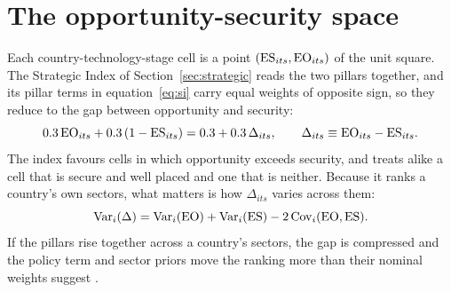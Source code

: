 \section{The opportunity-security space}\label{sec:joint}\label{sec:joint_space}

Each country-technology-stage cell is a point $(\mathrm{ES}_{its},\mathrm{EO}_{its})$ of the unit square. The
Strategic Index of Section~\ref{sec:strategic} reads the two pillars together, and its pillar terms
in equation~\eqref{eq:si} carry equal weights of opposite sign, so they reduce to the gap between
opportunity and security:
\begin{equation}\label{eq:joint_gap}
  0.3\,\mathrm{EO}_{its}+0.3\,(1-\mathrm{ES}_{its})=0.3+0.3\,\Delta_{its},\qquad
  \Delta_{its}\equiv\mathrm{EO}_{its}-\mathrm{ES}_{its}.
\end{equation}
The index favours cells in which opportunity exceeds security, and treats alike a cell that is
secure and well placed and one that is neither. Because it ranks a country's own sectors, what
matters is how $\Delta_{its}$ varies across them:
\begin{equation}\label{eq:joint_var}
  \operatorname{Var}_i(\Delta)=\operatorname{Var}_i(\mathrm{EO})+\operatorname{Var}_i(\mathrm{ES})
  -2\operatorname{Cov}_i(\mathrm{EO},\mathrm{ES}).
\end{equation}
If the pillars rise together across a country's sectors, the gap is compressed and the policy term
and sector priors move the ranking more than their nominal weights suggest
\citep{paruolo2013ratings,becker2017weights}.

